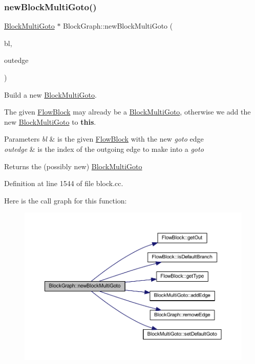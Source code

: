 \subsubsection{\texorpdfstring{newBlockMultiGoto()}{newBlockMultiGoto()}}
{\footnotesize\ttfamily \mbox{\hyperlink{class_block_multi_goto}{Block\+Multi\+Goto}} $\ast$ Block\+Graph\+::new\+Block\+Multi\+Goto (\begin{DoxyParamCaption}\item[{\mbox{\hyperlink{class_flow_block}{Flow\+Block}} $\ast$}]{bl,  }\item[{int4}]{outedge }\end{DoxyParamCaption})}



Build a new \mbox{\hyperlink{class_block_multi_goto}{Block\+Multi\+Goto}}. 

The given \mbox{\hyperlink{class_flow_block}{Flow\+Block}} may already be a \mbox{\hyperlink{class_block_multi_goto}{Block\+Multi\+Goto}}, otherwise we add the new \mbox{\hyperlink{class_block_multi_goto}{Block\+Multi\+Goto}} to {\bfseries{this}}. 
\begin{DoxyParams}{Parameters}
{\em bl} & is the given \mbox{\hyperlink{class_flow_block}{Flow\+Block}} with the new {\itshape goto} edge \\
\hline
{\em outedge} & is the index of the outgoing edge to make into a {\itshape goto} \\
\hline
\end{DoxyParams}
\begin{DoxyReturn}{Returns}
the (possibly new) \mbox{\hyperlink{class_block_multi_goto}{Block\+Multi\+Goto}} 
\end{DoxyReturn}


Definition at line 1544 of file block.\+cc.

Here is the call graph for this function\+:
\nopagebreak
\begin{figure}[H]
\begin{center}
\leavevmode
\includegraphics[width=350pt]{class_block_graph_aea5dbfcf345da8fe5fa335b07613e1af_cgraph}
\end{center}
\end{figure}
\mbox{\label{class_block_graph_a2e96df7e537a3f92320addcf01515e5d}} 
